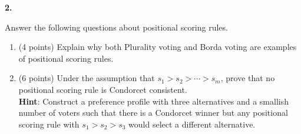 \documentclass[12pt]{amsart}
\newenvironment{statement}[1]{\smallskip\noindent\color[rgb]{0.0,0.0,0.0} {\bf #1.}}{}
\newcommand{\1}{\mathds{1}}
\begin{document}
\begin{statement}{2}
\begin{enumerate}
\begin{itemize}
    \end{itemize}
    Answer the following questions about positional scoring rules.
    \begin{enumerate}
        \item (4 points) Explain why both Plurality voting and Borda voting are examples of positional scoring rules.
        \item (6 points) Under the assumption that $s_1>s_2>\cdots >s_m$, prove that no positional scoring rule is Condorcet consistent.\\
        \textbf{Hint}: Construct a preference profile with three alternatives and a smallish number of voters such that there is a Condorcet winner but any positional scoring rule with $s_1>s_2>s_3$ would select a different alternative. 
    \end{enumerate}
\end{enumerate}
\end{statement}

\newpage
\end{document}
